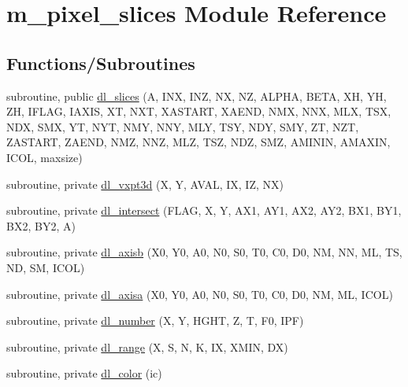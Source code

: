\hypertarget{namespacem__pixel__slices}{}\section{m\+\_\+pixel\+\_\+slices Module Reference}
\label{namespacem__pixel__slices}
\subsection*{Functions/\+Subroutines}
\begin{DoxyCompactItemize}
\item 
subroutine, public \mbox{\hyperlink{namespacem__pixel__slices_af2848516f6507a3d0bcca92ff07ef40f}{dl\+\_\+slices}} (A, I\+NX, I\+NZ, NX, NZ, A\+L\+P\+HA, B\+E\+TA, XH, YH, ZH, I\+F\+L\+AG, I\+A\+X\+IS, XT, N\+XT, X\+A\+S\+T\+A\+RT, X\+A\+E\+ND, N\+MX, N\+NX, M\+LX, T\+SX, N\+DX, S\+MX, YT, N\+YT, N\+MY, N\+NY, M\+LY, T\+SY, N\+DY, S\+MY, ZT, N\+ZT, Z\+A\+S\+T\+A\+RT, Z\+A\+E\+ND, N\+MZ, N\+NZ, M\+LZ, T\+SZ, N\+DZ, S\+MZ, A\+M\+I\+N\+IN, A\+M\+A\+X\+IN, I\+C\+OL, maxsize)
\item 
subroutine, private \mbox{\hyperlink{namespacem__pixel__slices_a61f419d67b700758eceed72e406a37f0}{dl\+\_\+vxpt3d}} (X, Y, A\+V\+AL, IX, IZ, NX)
\item 
subroutine, private \mbox{\hyperlink{namespacem__pixel__slices_a1508683ec3b2444091bb34d40b5d8b93}{dl\+\_\+intersect}} (F\+L\+AG, X, Y, A\+X1, A\+Y1, A\+X2, A\+Y2, B\+X1, B\+Y1, B\+X2, B\+Y2, A)
\item 
subroutine, private \mbox{\hyperlink{namespacem__pixel__slices_ab70907b4409a4346c450488b5bcb34a8}{dl\+\_\+axisb}} (X0, Y0, A0, N0, S0, T0, C0, D0, NM, NN, ML, TS, ND, SM, I\+C\+OL)
\item 
subroutine, private \mbox{\hyperlink{namespacem__pixel__slices_afcc122fe448b5f806c0a372a203cd9ea}{dl\+\_\+axisa}} (X0, Y0, A0, N0, S0, T0, C0, D0, NM, ML, I\+C\+OL)
\item 
subroutine, private \mbox{\hyperlink{namespacem__pixel__slices_a7d9372496e88c384aea5ad1b26750d1b}{dl\+\_\+number}} (X, Y, H\+G\+HT, Z, T, F0, I\+PF)
\item 
subroutine, private \mbox{\hyperlink{namespacem__pixel__slices_a47408b6c6411a3c3cb3419b319e57978}{dl\+\_\+range}} (X, S, N, K, IX, X\+M\+IN, DX)
\item 
subroutine, private \mbox{\hyperlink{namespacem__pixel__slices_a8e362bf8eea80faddc97f7d137c95f9c}{dl\+\_\+color}} (ic)
\item 

\end{DoxyCompactItemize}
